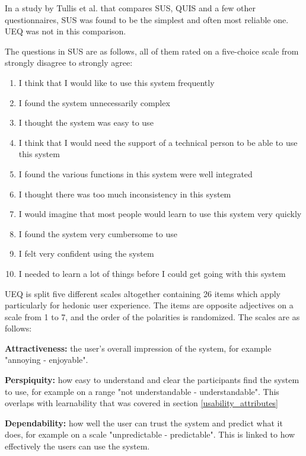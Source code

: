 In a study by Tullis et al. that compares SUS, QUIS and a few other questionnaires, SUS was found to be the simplest and often most reliable one. UEQ was not in this comparison. \cite{tullis2004comparison}

The questions in SUS are as follows, all of them rated on a five-choice scale from strongly disagree to strongly agree:

\begin{enumerate}
\item I think that I would like to use this system frequently
\item I found the system unnecessarily complex
\item I thought the system was easy to use                      
\item I think that I would need the support of a technical person to be able to use this system
\item I found the various functions in this system were well integrated
\item I thought there was too much inconsistency in this system
\item I would imagine that most people would learn to use this system very quickly
\item I found the system very cumbersome to use
\item I felt very confident using the system
\item I needed to learn a lot of things before I could get going with this system 
\end{enumerate}

\cite{brooke1996sus}

UEQ is split five different scales altogether containing 26 items which apply particularly for hedonic user experience. The items are opposite adjectives on a scale from 1 to 7, and the order of the polarities is randomized. The scales are as follows:

\textbf{Attractiveness:} the user's overall impression of the system, for example "annoying - enjoyable".

\textbf{Perspiquity:} how easy to understand and clear the participants find the system to use, for example on a range "not understandable - understandable". This overlaps with learnability that was covered in section \ref{usability_attributes}

\textbf{Dependability:} how well the user can trust the system and predict what it does, for example on a scale "unpredictable - predictable". This is linked to how effectively the users can use the system.


